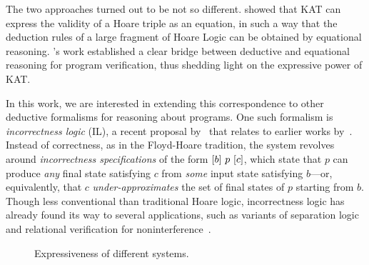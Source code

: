 The two approaches turned out to be not so different. \citet{Kozen_2000}
showed that KAT can express the validity of a Hoare triple as an equation, in
such a way that the deduction rules of a large fragment of Hoare Logic can be
obtained by equational reasoning.  \citeauthor{Kozen_2000}'s work
established a clear bridge between deductive and equational reasoning for
program verification, thus shedding light on the expressive power of KAT\@.

In this work, we are interested in extending this correspondence to other
deductive formalisms for reasoning about programs.  One such formalism is
\emph{incorrectness logic} (IL), a recent proposal
by~\citet{OHearn_2020} that relates to earlier works
by~\citet{devries_ReverseHoareLogic_2011}. 
Instead of correctness, as in the Floyd-Hoare tradition, the system
revolves around \emph{incorrectness specifications} of the form
\([b]~p~[c]\), which state that \(p\) can produce \emph{any} final
state satisfying \(c\) from \emph{some} input state satisfying \(b\)---or,
equivalently, that \(c\) \emph{under-approximates} the set of final states of
\(p\) starting from \(b\).  Though less conventional than traditional Hoare
logic, incorrectness logic has already found its way to several applications,
such as variants of separation logic~\cite{Raad_Berdine_Dang_Dreyer_OHearn_Villard_2020} 
and relational verification for noninterference~\cite{murray_UnderApproximateRelationalLogic_2020a}.

\begin{figure}
    \centering
    \caption{Expressiveness of different systems.}\label{fig:expressiveness-of-different-kat}
\end{figure}


